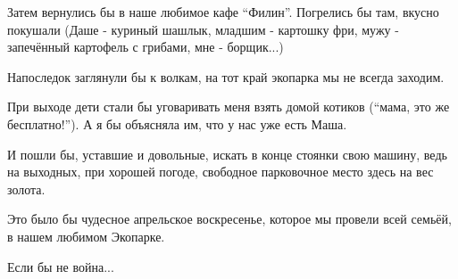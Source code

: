 Затем вернулись бы в наше любимое кафе \enquote{Филин}. Погрелись бы там, вкусно
покушали (Даше - куриный шашлык, младшим - картошку фри, мужу - запечённый
картофель с грибами, мне - борщик...) 

Напоследок заглянули бы к волкам, на тот край экопарка мы не всегда заходим. 

При выходе дети стали бы уговаривать меня взять домой котиков (\enquote{мама, это же
бесплатно!}). А я бы объясняла им, что у нас уже есть Маша.

И пошли бы, уставшие и довольные, искать в конце стоянки свою машину, ведь на
выходных, при хорошей погоде, свободное парковочное место здесь на вес золота.

Это было бы чудесное апрельское воскресенье, которое мы провели всей семьёй, в
нашем любимом Экопарке. 

Если бы не война...
